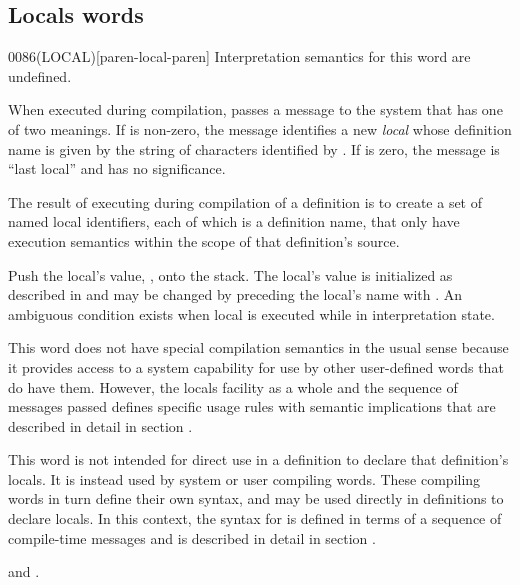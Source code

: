 \subsection{Locals words} %

\begin{worddef}[LOCAL]{0086}{(LOCAL)}[paren-local-paren]
\interpret
	Interpretation semantics for this word are undefined.

\execute

	When executed during compilation,  passes a
	message to the system that has one of two meanings. If 
	is non-zero, the message identifies a new \emph{local} whose
	definition name is given by the string of characters identified
	by . If  is zero, the message is ``last
	local'' and  has no significance.

	The result of executing  during compilation of a
	definition is to create a set of named local identifiers, each
	of which is a definition name, that only have execution
	semantics within the scope of that definition's source.

\execute[local]

	Push the local's value, , onto the stack. The local's
	value is initialized as described in  and may be changed by preceding the local's
	name with . An ambiguous condition exists when local is
	executed while in interpretation state.

\scrollmode
{}

\errorstopmode

\note
	This word does not have special compilation semantics in the
	usual sense because it provides access to a system capability
	for use by other user-defined words that do have them. However,
	the locals facility as a whole and the sequence of messages
	passed defines specific usage rules with semantic implications
	that are described in detail in section
	.

\note
	This word is not intended for direct use in a definition to
	declare that definition's locals. It is instead used by system
	or user compiling words. These compiling words in turn define
	their own syntax, and may be used directly in definitions to
	declare locals. In this context, the syntax for 
	is defined in terms of a sequence of compile-time messages and
	is described in detail in section .

\scrollmode
{}

\errorstopmode

\see {} and
	.
\end{worddef}


